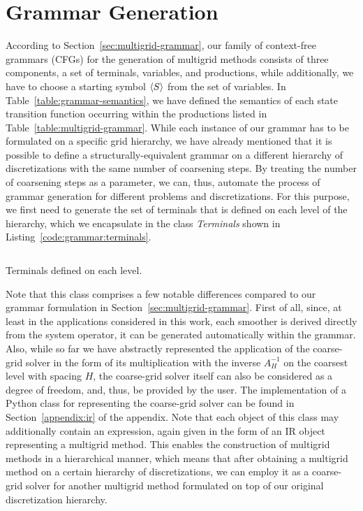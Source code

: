\section{Grammar Generation}
According to Section~\ref{sec:multigrid-grammar}, our family of context-free grammars (CFGs) for the generation of multigrid methods consists of three components, a set of terminals, variables, and productions, while additionally, we have to choose a starting symbol $\langle S \rangle$ from the set of variables.
In Table~\ref{table:grammar-semantics}, we have defined the semantics of each state transition function occurring within the productions listed in Table~\ref{table:multigrid-grammar}.
While each instance of our grammar has to be formulated on a specific grid hierarchy, we have already mentioned that it is possible to define a structurally-equivalent grammar on a different hierarchy of discretizations with the same number of coarsening steps.
By treating the number of coarsening steps as a parameter, we can, thus, automate the process of grammar generation for different problems and discretizations.
For this purpose, we first need to generate the set of terminals that is defined on each level of the hierarchy, which we encapsulate in the class \emph{Terminals} shown in Listing~\ref{code:grammar:terminals}.
\begin{listing}
	\inputminted{python}{evostencils/grammar/terminals.py}
	\caption{Terminals defined on each level.}
	\label{code:grammar:terminals}
\end{listing}
Note that this class comprises a few notable differences compared to our grammar formulation in Section~\ref{sec:multigrid-grammar}.
First of all, since, at least in the applications considered in this work, each smoother is derived directly from the system operator, it can be generated automatically within the grammar.
Also, while so far we have abstractly represented the application of the coarse-grid solver in the form of its multiplication with the inverse $A^{-1}_H$ on the coarsest level with spacing $H$, the coarse-grid solver itself can also be considered as a degree of freedom, and, thus, be provided by the user.
The implementation of a Python class for representing the coarse-grid solver can be found in Section~\ref{appendix:ir} of the appendix.
Note that each object of this class may additionally contain an expression, again given in the form of an IR object representing a multigrid method.
This enables the construction of multigrid methods in a hierarchical manner, which means that after obtaining a multigrid method on a certain hierarchy of discretizations, we can employ it as a coarse-grid solver for another multigrid method formulated on top of our original discretization hierarchy.

